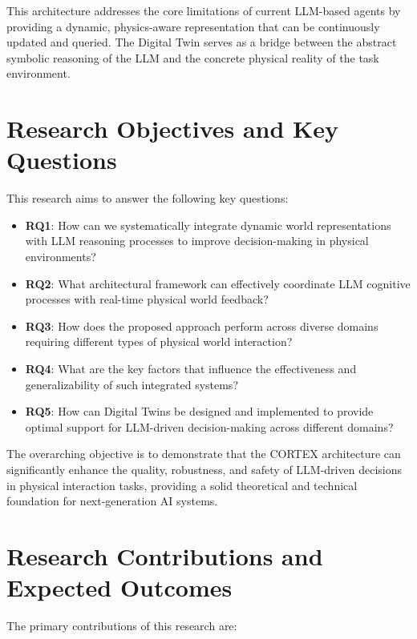 This architecture addresses the core limitations of current LLM-based agents by providing a dynamic, physics-aware representation that can be continuously updated and queried. The Digital Twin serves as a bridge between the abstract symbolic reasoning of the LLM and the concrete physical reality of the task environment.

\section{Research Objectives and Key Questions}

This research aims to answer the following key questions:

\begin{itemize}
    \item \textbf{RQ1}: How can we systematically integrate dynamic world representations with LLM reasoning processes to improve decision-making in physical environments?
    \item \textbf{RQ2}: What architectural framework can effectively coordinate LLM cognitive processes with real-time physical world feedback?
    \item \textbf{RQ3}: How does the proposed approach perform across diverse domains requiring different types of physical world interaction?
    \item \textbf{RQ4}: What are the key factors that influence the effectiveness and generalizability of such integrated systems?
    \item \textbf{RQ5}: How can Digital Twins be designed and implemented to provide optimal support for LLM-driven decision-making across different domains?
\end{itemize}

The overarching objective is to demonstrate that the CORTEX architecture can significantly enhance the quality, robustness, and safety of LLM-driven decisions in physical interaction tasks, providing a solid theoretical and technical foundation for next-generation AI systems.

\section{Research Contributions and Expected Outcomes}

The primary contributions of this research are:

